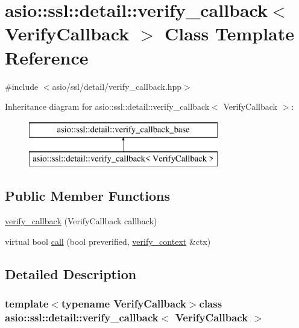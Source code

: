\hypertarget{classasio_1_1ssl_1_1detail_1_1verify__callback}{}\section{asio\+:\+:ssl\+:\+:detail\+:\+:verify\+\_\+callback$<$ Verify\+Callback $>$ Class Template Reference}
\label{classasio_1_1ssl_1_1detail_1_1verify__callback}


{\ttfamily \#include $<$asio/ssl/detail/verify\+\_\+callback.\+hpp$>$}

Inheritance diagram for asio\+:\+:ssl\+:\+:detail\+:\+:verify\+\_\+callback$<$ Verify\+Callback $>$\+:\begin{figure}[H]
\begin{center}
\leavevmode
\includegraphics[height=2.000000cm]{classasio_1_1ssl_1_1detail_1_1verify__callback}
\end{center}
\end{figure}
\subsection*{Public Member Functions}
\begin{DoxyCompactItemize}
\item 
\hyperlink{classasio_1_1ssl_1_1detail_1_1verify__callback_a6ff2c6fd2f5c56c12eb456aa29202237}{verify\+\_\+callback} (Verify\+Callback callback)
\item 
virtual bool \hyperlink{classasio_1_1ssl_1_1detail_1_1verify__callback_a02730f79fdfd48222108cc73a2b65d36}{call} (bool preverified, \hyperlink{classasio_1_1ssl_1_1verify__context}{verify\+\_\+context} \&ctx)
\end{DoxyCompactItemize}


\subsection{Detailed Description}
\subsubsection*{template$<$typename Verify\+Callback$>$class asio\+::ssl\+::detail\+::verify\+\_\+callback$<$ Verify\+Callback $>$}



